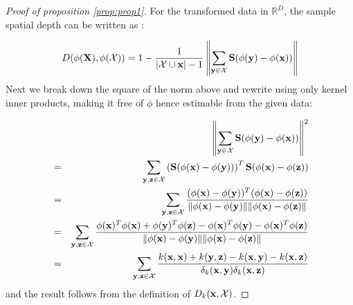 \documentclass[10pt, conference, compsocconf]{IEEEtran}
\begin{document}
\begin{proof}[Proof of proposition \ref{prop:prop1}]
For the transformed data in $\mathbb{R}^D$, the sample spatial depth can be written as \cite{Chen09}:

$$ D( \phi({\mathbf{X}}), \phi(\mathcal{X})) = 1 - \frac{1}{| \mathcal{X} \cup {\bf{x}} | - 1} \left\| \sum_{{\bf{y}} \in \mathcal{X}} {\mathbf{S}} (\phi({\bf{y}}) - \phi({\bf{x}})) \right\| $$
Next we break down the square of the norm above and rewrite using only kernel inner products, making it free of $\phi$ hence estimable from the given data:

\begin{eqnarray*}
&&\left\| \sum_{{\bf{y}} \in \mathcal{X}} {\mathbf{S}} (\phi({\bf{y}}) - \phi({\bf{x}})) \right\|^2\\
&=& \sum_{{\bf{y}}, {\bf{z}} \in \mathcal{X}} \left( {\mathbf{S}} (\phi({\bf{x}}) - \phi({\bf{y}})) \right)^T {\mathbf{S}} (\phi({\bf{x}}) - \phi({\bf{z}})) \\
&=& \sum_{{\bf{y}}, {\bf{z}} \in \mathcal{X}} \frac{ (\phi({\bf{x}}) - \phi({\bf{y}}))^T(\phi({\bf{x}}) - \phi({\bf{z}}))}{\| \phi({\bf{x}}) - \phi({\bf{y}}) \| \| \phi({\bf{x}}) - \phi({\bf{z}}) \|} \\
&=& \sum_{{\bf{y}}, {\bf{z}} \in \mathcal{X}} \frac{ \phi({\bf{x}})^T\phi({\bf{x}}) + \phi({\bf{y}})^T\phi({\bf{z}}) - \phi({\bf{x}})^T\phi({\bf{y}}) - \phi({\bf{x}})^T\phi({\bf{z}})}{\| \phi({\bf{x}}) - \phi({\bf{y}}) \| \| \phi({\bf{x}}) - \phi({\bf{z}}) \|} \\
&=& \sum_{{\bf{y}}, {\bf{z}} \in \mathcal{X}} \frac{k({\bf{x}}, {\bf{x}}) + k({\bf{y}}, {\bf{z}}) - k({\bf{x}}, {\bf{y}}) - k({\bf{x}}, {\bf{z}})}{\delta_k({\bf{x}}, {\bf{y}}) \delta_k({\bf{x}}, {\bf{z}})}
\end{eqnarray*}
and the result follows from the definition of $D_k({\bf{x}}, \mathcal{X})$.
\end{proof}
\end{document}
